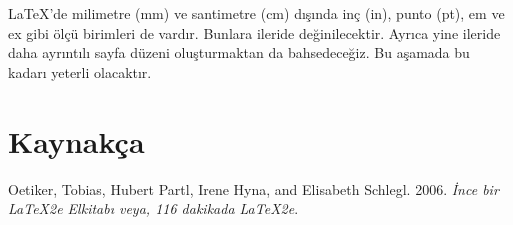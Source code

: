 \documentclass[
  letterpaper,
  DIV=11,
  numbers=noendperiod]{scrreprt}
\newlength{\cslhangindent}
\newlength{\cslentryspacingunit} %
\newenvironment{CSLReferences}[2] %
 {%
  \setlength{\parindent}{0pt}
  \ifodd #1
  \let\oldpar\par
  \def\par{\hangindent=\cslhangindent\oldpar}
  \fi
  \setlength{\parskip}{#2\cslentryspacingunit}
 }%
 {}
\begin{document}
\begin{tcolorbox}[enhanced jigsaw, opacitybacktitle=0.6, coltitle=black, leftrule=.75mm, rightrule=.15mm, toprule=.15mm, bottomtitle=1mm, titlerule=0mm, colbacktitle=quarto-callout-note-color!10!white, breakable, arc=.35mm, opacityback=0, colframe=quarto-callout-note-color-frame, toptitle=1mm, title=\textcolor{quarto-callout-note-color}{\faInfo}\hspace{0.5em}{Not}, bottomrule=.15mm, left=2mm, colback=white]
{\LaTeX}'de milimetre (mm) ve santimetre (cm) dışında inç (in), punto
(pt), em ve ex gibi ölçü birimleri de vardır. Bunlara ileride
değinilecektir. Ayrıca yine ileride daha ayrıntılı sayfa düzeni
oluşturmaktan da bahsedeceğiz. Bu aşamada bu kadarı yeterli olacaktır.
\end{tcolorbox}


\hypertarget{kaynakuxe7a-1}{%
\chapter*{Kaynakça}\label{kaynakuxe7a-1}}

\hypertarget{refs}{}
\begin{CSLReferences}{1}{0}
\leavevmode{}%
Oetiker, Tobias, Hubert Partl, Irene Hyna, and Elisabeth Schlegl. 2006.
\emph{{İnce bir LaTeX2e Elkitabı veya, 116 dakikada LaTeX2e}}.

\end{CSLReferences}
\end{document}
